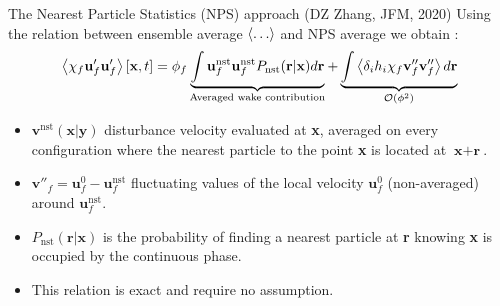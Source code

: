 \documentclass{sintefbeamer}
\begin{document}
\begin{frame}{The Nearest Particle Statistics (NPS) approach (DZ Zhang, JFM, 2020)}
  Using the relation between ensemble average $\left<\ldots\right>$ and NPS average we obtain :
  \begin{equation*}
    \left<\chi_f \textbf{u}'_f\textbf{u}'_f\right>[\textbf{x},t]
    = \phi_f
    \underbrace{\int 
      \textbf{u}^\text{nst}_f
      \textbf{u}^\text{nst}_f 
      P_\text{nst}(\textbf{r}|\textbf{x}) d\textbf{r} 
    }_\text{Averaged wake contribution}
    + \underbrace{ 
      \int \left<\delta_i h_i \chi_f \textbf{v}_f''\textbf{v}_f''\right>  d\textbf{r}
    }_{\mathcal{O}(\phi^2)}
  \end{equation*}

\begin{itemize}
  \item $\textbf{v}^\text{nst}(\textbf{x}|\textbf{y})$ disturbance velocity evaluated at \textbf{x}, averaged on every configuration where the nearest particle to the point \textbf{x} is located at $\textbf{x} + \textbf{r}$. 
  \item $\textbf{v}''_f = \textbf{u}^0_f - \textbf{u}^\text{nst}_f$ fluctuating values of the local velocity $\textbf{u}_f^0$ (non-averaged) around $\textbf{u}_f^\text{nst}$.
  \item $P_\text{nst}(\textbf{r}|\textbf{x})$ is the probability of finding a nearest particle at \textbf{r} knowing \textbf{x} is occupied by the continuous phase.   
  \item This relation is exact and require no assumption. 
\end{itemize}
\end{frame}
\end{document}
